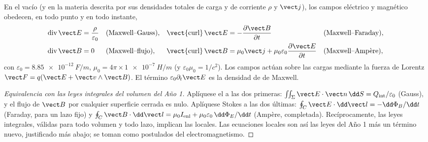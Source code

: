 \begin{theorem}\label{thm:b2:maxwell-equations:maxwell}
En el vacío (y en la materia descrita por sus densidades totales de carga
y de corriente $\rho$ y $\vect j$), los campos eléctrico y magnético
obedecen, en todo punto y en todo instante,
\begin{align*}
\operatorname{div}\vect E &= \frac\rho{\varepsilon_0} &&\text{(Maxwell--Gauss)} , &
\operatorname{\vect{curl}}\vect E &= -\frac{\partial\vect B}{\partial t} &&\text{(Maxwell--Faraday)} ,\\
\operatorname{div}\vect B &= 0 &&\text{(Maxwell--flujo)} , &
\operatorname{\vect{curl}}\vect B &= \mu_0\vect j + \mu_0\varepsilon_0\frac{\partial\vect E}{\partial t} &&\text{(Maxwell--Ampère)} ,
\end{align*}
con $\varepsilon_0 = \qty{8.85e-12}{F/m}$, $\mu_0 = 4\pi \times \qty{1e-7}{H/m}$ (y
$\varepsilon_0\mu_0 = 1/c^2$). Los campos actúan sobre las cargas mediante la
fuerza de Lorentz $\vect F = q(\vect E + \vect v\wedge\vect B)$. El término $\varepsilon_0\partial_t\vect E$
es la densidad de \emph{} de Maxwell.
\end{theorem}

\begin{proof}[Equivalencia con las leyes integrales del volumen del Año 1]
Aplíquese el  a las dos primeras: $\iint_\Sigma\vect E\cdot
\vect n\,\dd S = Q_{\text{int}}/\varepsilon_0$ (Gauss), y el flujo de $\vect B$ por
cualquier superficie cerrada es nulo. Aplíquese Stokes a las dos últimas:
$\oint_C\vect E\cdot\dd\vect l = -\dd\Phi_B/\dd t$ (Faraday, para un lazo fijo)
y $\oint_C\vect B\cdot\dd\vect l = \mu_0I_{\text{enl}} + \mu_0\varepsilon_0\,\dd\Phi_E/\dd t$
(Ampère, completada). Recíprocamente, las leyes integrales, válidas para
todo volumen y todo lazo, implican las locales. Las ecuaciones locales son
así las leyes del Año 1 más un término nuevo, justificado más abajo; se
toman como postulados del electromagnetismo.
\end{proof}

